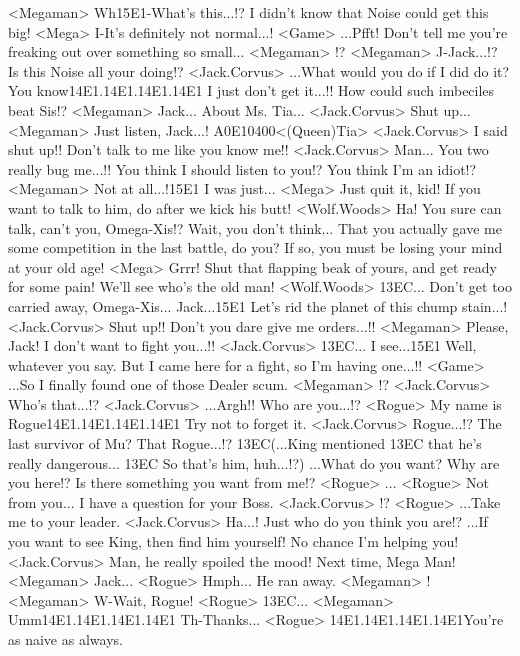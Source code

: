 <Megaman> Wh{15}{E1}-What's this...!? 
I didn't know that Noise could get this big! 
<Mega> I-It's definitely not normal...! 
<Game> ...Pfft! 
Don't tell me you're freaking out over something so small... 
<Megaman> !? 
<Megaman> J-Jack...!? 
Is this Noise all your doing!? 
<Jack.Corvus> ...What would you do if I did do it? 
You know{14}{E1}.{14}{E1}.{14}{E1}.{14}{E1} I just don't get it...!! 
How could such imbeciles beat Sis!? 
<Megaman> Jack... About Ms. Tia... 
<Jack.Corvus> Shut up... 
<Megaman> Just listen, Jack...! 
{A0}{E1}{04}{00}<(Queen)Tia> 
<Jack.Corvus> I said shut up!! Don't talk to me like you know me!! 
<Jack.Corvus> Man... You two really bug me...!! 
You think I should listen to you!? 
You think I'm an idiot!? 
<Megaman> Not at all...!{15}{E1} I was just... 
<Mega> Just quit it, kid! 
If you want to talk to him, do after we kick his butt! 
<Wolf.Woods> Ha! You sure can talk, can't you, Omega-Xis!? 
Wait, you don't think... 
That you actually gave me some competition in the last battle, do you? 
If so, you must be losing your mind at your old age! 
<Mega> Grrr! 
Shut that flapping beak of yours, and get ready for some pain! 
We'll see who's the old man! 
<Wolf.Woods> {13}{EC}... 
Don't get too carried away, Omega-Xis... 
Jack...{15}{E1} Let's rid the planet of this chump stain...! 
<Jack.Corvus> Shut up!! 
Don't you dare give me orders...!! 
<Megaman> Please, Jack! 
I don't want to fight you...!! 
<Jack.Corvus> {13}{EC}... 
I see...{15}{E1} Well, whatever you say. 
But I came here for a fight, so I'm having one...!! 
<Game> ...So I finally found one of those Dealer scum. 
<Megaman> !? 
<Jack.Corvus> Who's that...!? 
<Jack.Corvus> ...Argh!! Who are you...!? 
<Rogue> My name is Rogue{14}{E1}.{14}{E1}.{14}{E1}.{14}{E1} Try not to forget it. 
<Jack.Corvus> Rogue...!? 
The last survivor of Mu? That Rogue...!? 
{13}{EC}(...King mentioned {13}{EC} that he's really dangerous... {13}{EC} So that's him, huh...!?) 
...What do you want? Why are you here!? 
Is there something you want from me!? 
<Rogue> ... 
<Rogue> Not from you... 
I have a question for your Boss. 
<Jack.Corvus> !? 
<Rogue> ...Take me to your leader. 
<Jack.Corvus> Ha...! 
Just who do you think you are!? 
...If you want to see King, then find him yourself! No chance I'm helping you! 
<Jack.Corvus> Man, he really spoiled the mood! 
Next time, Mega Man! 
<Megaman> Jack... 
<Rogue> Hmph... He ran away. 
<Megaman> ! 
<Megaman> W-Wait, Rogue! 
<Rogue> {13}{EC}... 
<Megaman> Umm{14}{E1}.{14}{E1}.{14}{E1}.{14}{E1} Th-Thanks... 
<Rogue> {14}{E1}.{14}{E1}.{14}{E1}.{14}{E1}You're as naive as always. 
